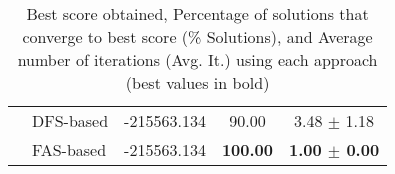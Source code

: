 \begin{table}[ h ]
\begin{tabular}{|c|l|c|c|c|}
					& DFS-based & -215563.134 & 90.00 & 3.48 $\pm$ 1.18 \\ \cline{2-5}
					& FAS-based & -215563.134 & \textbf{100.00} & \textbf{1.00 $\pm$ 0.00} \\ \hline
		\end{tabular}
		\caption{Best score obtained, Percentage of solutions that converge to best score (\% Solutions), and Average number of iterations (Avg. It.) using each approach (best values in bold)}
		\label{tab:comparison}
	\end{table}
	
